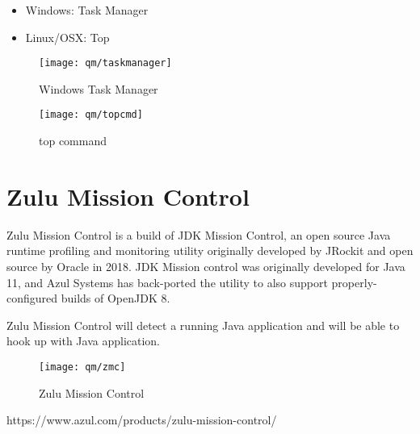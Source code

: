 \begin{itemize}
\item Windows: Task Manager
\item Linux/OSX: Top
\end{itemize}

\begin{figure}[H]
  \centering
  \texttt{[image: qm/taskmanager]}
  \caption{Windows Task Manager}
\end{figure}

\vspace{3mm}

\begin{figure}[H]
  \centering
  \texttt{[image: qm/topcmd]}
  \caption{top command}
\end{figure}

\section{Zulu Mission Control}
Zulu Mission Control is a build of JDK Mission Control,
an open source Java runtime profiling and monitoring utility
originally developed by JRockit and open source by Oracle in 2018.
JDK Mission control was originally developed for Java 11,
and Azul Systems has back-ported the utility to also support
properly-configured builds of OpenJDK 8.

\vspace{3mm}

Zulu Mission Control will detect a running Java application and
will be able to hook up with Java application.

\begin{figure}[H]
  \centering
  \texttt{[image: qm/zmc]}
  \caption{Zulu Mission Control}
\end{figure}




https://www.azul.com/products/zulu-mission-control/

